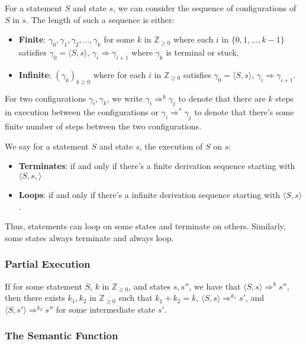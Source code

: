 For a statement $S$ and state $s$, we can consider the sequence of
configurations of $S$ in $s$. The length of such a sequence is either:
\begin{itemize}
  \item \textbf{Finite}: $\gamma_0, \gamma_1, \gamma_2, \ldots, \gamma_k$
  for some $k$ in $\mathbb{Z}_{\geq 0}$ where each $i$ in $\{0, 1, \ldots, k - 1\}$ satisfies
  $\gamma_0 = \langle S, s \rangle$, $\gamma_i \Rightarrow \gamma_{i + 1}$ where
  $\gamma_k$ is terminal or stuck,
  \item \textbf{Infinite}: $(\gamma_k)_{k \geq 0}$ where 
  for each $i$ in $\mathbb{Z}_{\geq 0}$ satisfies 
  $\gamma_0 = \langle S, s \rangle$, $\gamma_i \Rightarrow \gamma_{i + 1}$.
\end{itemize} For two configurations $\gamma_i, \gamma_k$, we write
$\gamma_i \Rightarrow^k \gamma_j$ to denote that there are $k$ steps 
in execution between the configurations or $\gamma_i \Rightarrow^* \gamma_j$
to denote that there's some finite number of steps between the two
configurations.

\newpage

\noindent
We say for a statement $S$ and state $s$, the execution of $S$ on $s$:
\begin{itemize}
  \item \textbf{Terminates}: if and only if there's a finite derivation
  sequence starting with $\langle S, s, \rangle$
  \item \textbf{Loops}: if and only if there's a infinite derivation
  sequence starting with $\langle S, s \rangle$.
\end{itemize} Thus, statements can loop on some states and terminate on
others. Similarly, some states always terminate and always loop.

\subsubsection{Partial Execution}

If for some statement $S$, $k$ in $\mathbb{Z}_{\geq 0}$, and states 
$s, s''$, we have that $\langle S, s\rangle \Rightarrow^k s''$,
then there exists $k_1, k_2$ in $\mathbb{Z}_{\geq 0}$ such that 
$k_1 + k_2 = k$, $\langle S, s \rangle \Rightarrow^{k_1} s'$,
and $\langle S, s' \rangle \Rightarrow^{k_2} s''$ for some
intermediate state $s'$.

\subsubsection{The Semantic Function}


